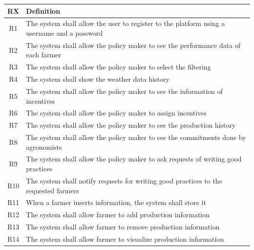 \begin{center}
    \setlength\arrayrulewidth{1pt}
    \begin{longtable}{|c|m{}|}
            
            \hline
            \rowcolor{myblue}\color{white}RX & \color{white}Definition \\
            \hline
            \textsc{R1}  &    The system shall allow the user to register to the platform using a username and a password  \\
            \hline
            \hline
            \hline
            \textsc{R2}     &   The system shall allow the policy maker to see the performance data of each farmer \\
            \hline
            \textsc{R3}  &    The system shall allow the policy maker to select the filtering \\
            \hline
            \textsc{R4}  &    The system shall show the weather data history \\
            \hline
            \textsc{R5}  &    The system shall allow the policy maker to see the information of incentives \\
            \hline
            \textsc{R6}  &    The system shall allow the policy maker to assign incentives \\
            \hline
            \textsc{R7}  &    The system shall allow the policy maker to see the production history \\
            \hline
            \textsc{R8}  &    The system shall allow the policy maker to see the commitments done by agronomists \\
            \hline
            \textsc{R9}  &    The system shall allow the policy maker to ask requests of  writing good practices \\
            \hline
            \textsc{R10}  &    The system shall notify requests for writing good practices to the requested farmers  \\
            \hline
            \hline
            \hline
            \textsc{R11}  &    When a farmer inserts information, the system shall store it  \\
            \hline
            \textsc{R12}  &    The system shall allow farmer to add production information  \\
            \textsc{R13}  &    The system shall allow farmer to remove production information  \\
            \textsc{R14}  &    The system shall allow farmer to visualize production information  \\

\end{longtable}
\end{center}
